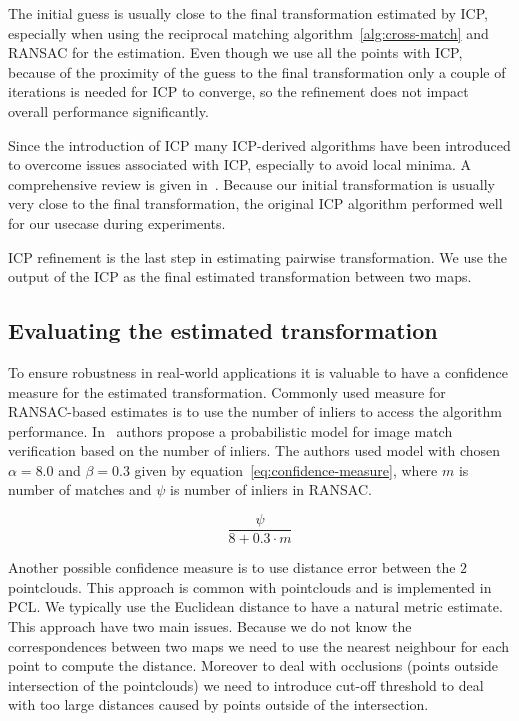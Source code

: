 The initial guess is usually close to the final transformation estimated by \gls{ICP}, especially when using the reciprocal matching algorithm~\ref{alg:cross-match} and \gls{RANSAC} for the estimation. Even though we use all the points with \gls{ICP}, because of the proximity of the guess to the final transformation only a couple of iterations is needed for \gls{ICP} to converge, so the refinement does not impact overall performance significantly.

Since the introduction of \gls{ICP} many \gls{ICP}-derived algorithms have been introduced to overcome issues associated with \gls{ICP}, especially to avoid local minima. A comprehensive review is given in~\citet{pomerleau2015reviewregistration}. Because our initial transformation is usually very close to the final transformation, the original \gls{ICP} algorithm performed well for our usecase during experiments.

\gls{ICP} refinement is the last step in estimating pairwise transformation. We use the output of the \gls{ICP} as the final estimated transformation between two maps.

\subsection{Evaluating the estimated transformation}
\label{sec:transform-evaluation}

To ensure robustness in real-world applications it is valuable to have a confidence measure for the estimated transformation. Commonly used measure for \gls{RANSAC}-based estimates is to use the number of inliers to access the algorithm performance. In~\citet{brown2007automatic} authors propose a probabilistic model for image match verification based on the number of inliers. The authors used model with chosen $\alpha = 8.0$ and $\beta = 0.3$ given by equation~\eqref{eq:confidence-measure}, where $m$ is number of matches and $\psi$ is number of inliers in \gls{RANSAC}.

\begin{equation}
\label{eq:confidence-measure}
\frac{\psi}{8 + 0.3 \cdot m}
\end{equation}

Another possible confidence measure is to use distance error between the $2$ pointclouds. This approach is common with pointclouds and is implemented in \gls{PCL}. We typically use the Euclidean distance to have a natural metric estimate. This approach have two main issues. Because we do not know the correspondences between two maps we need to use the nearest neighbour for each point to compute the distance. Moreover to deal with occlusions (points outside intersection of the pointclouds) we need to introduce cut-off threshold to deal with too large distances caused by points outside of the intersection.

